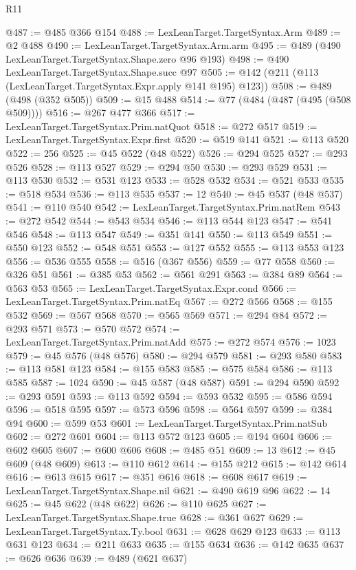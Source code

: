 \begin{lexlean}{R11}
\begin{coremodule}
{{{{{{{{{{{{{{{{{{{{{{{{{{{{{{{{{{{{{{{{{{{{{{{{{{{{{{{{{{{{{{{{{{{{{{{{{{{{{{{{{{{{{{{{{{{{{{{{{{{{{{{{{{@487 := @485 @366 @154
@488 := LexLeanTarget.TargetSyntax.Arm
@489 := @2 @488
@490 := LexLeanTarget.TargetSyntax.Arm.arm
@495 := @489 (@490 LexLeanTarget.TargetSyntax.Shape.zero @96 @193)
@498 := @490 LexLeanTarget.TargetSyntax.Shape.succ @97
@505 := @142 (@211 (@113 (LexLeanTarget.TargetSyntax.Expr.apply @141 @195) @123))
@508 := @489 (@498 (@352 @505))
@509 := @15 @488
@514 := @77 (@484 (@487 (@495 (@508 @509))))
@516 := @267 @477 @366
@517 := LexLeanTarget.TargetSyntax.Prim.natQuot
@518 := @272 @517
@519 := LexLeanTarget.TargetSyntax.Expr.first
@520 := @519 @141
@521 := @113 @520
@522 := 256
@525 := @45 @522 (@48 @522)
@526 := @294 @525
@527 := @293 @526
@528 := @113 @527
@529 := @294 @50
@530 := @293 @529
@531 := @113 @530
@532 := @531 @123
@533 := @528 @532
@534 := @521 @533
@535 := @518 @534
@536 := @113 @535
@537 := 12
@540 := @45 @537 (@48 @537)
@541 := @110 @540
@542 := LexLeanTarget.TargetSyntax.Prim.natRem
@543 := @272 @542
@544 := @543 @534
@546 := @113 @544 @123
@547 := @541 @546
@548 := @113 @547
@549 := @351 @141
@550 := @113 @549
@551 := @550 @123
@552 := @548 @551
@553 := @127 @552
@555 := @113 @553 @123
@556 := @536 @555
@558 := @516 (@367 @556)
@559 := @77 @558
@560 := @326 @51
@561 := @385 @53
@562 := @561 @291
@563 := @384 @89
@564 := @563 @53
@565 := LexLeanTarget.TargetSyntax.Expr.cond
@566 := LexLeanTarget.TargetSyntax.Prim.natEq
@567 := @272 @566
@568 := @155 @532
@569 := @567 @568
@570 := @565 @569
@571 := @294 @84
@572 := @293 @571
@573 := @570 @572
@574 := LexLeanTarget.TargetSyntax.Prim.natAdd
@575 := @272 @574
@576 := 1023
@579 := @45 @576 (@48 @576)
@580 := @294 @579
@581 := @293 @580
@583 := @113 @581 @123
@584 := @155 @583
@585 := @575 @584
@586 := @113 @585
@587 := 1024
@590 := @45 @587 (@48 @587)
@591 := @294 @590
@592 := @293 @591
@593 := @113 @592
@594 := @593 @532
@595 := @586 @594
@596 := @518 @595
@597 := @573 @596
@598 := @564 @597
@599 := @384 @94
@600 := @599 @53
@601 := LexLeanTarget.TargetSyntax.Prim.natSub
@602 := @272 @601
@604 := @113 @572 @123
@605 := @194 @604
@606 := @602 @605
@607 := @600 @606
@608 := @485 @51
@609 := 13
@612 := @45 @609 (@48 @609)
@613 := @110 @612
@614 := @155 @212
@615 := @142 @614
@616 := @613 @615
@617 := @351 @616
@618 := @608 @617
@619 := LexLeanTarget.TargetSyntax.Shape.nil
@621 := @490 @619 @96
@622 := 14
@625 := @45 @622 (@48 @622)
@626 := @110 @625
@627 := LexLeanTarget.TargetSyntax.Shape.true
@628 := @361 @627
@629 := LexLeanTarget.TargetSyntax.Ty.bool
@631 := @628 @629 @123
@633 := @113 @631 @123
@634 := @211 @633
@635 := @155 @634
@636 := @142 @635
@637 := @626 @636
@639 := @489 (@621 @637)
}}}}}}}}}}}}}}}}}}}}}}}}}}}}}}}}}}}}}}}}}}}}}}}}}}}}}}}}}}}}}}}}}}}}}}}}}}}}}}}}}}}}}}}}}}}}}}}}}}}}}}}}}}
\end{coremodule}
\end{lexlean}
